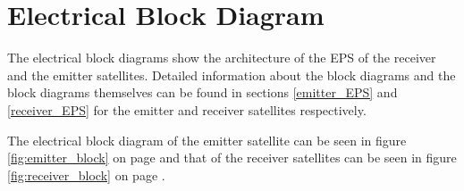 \section{Electrical Block Diagram}
\label{EBD}

The electrical block diagrams show the architecture of the \ac{EPS} of the receiver and the emitter satellites. Detailed information about the block diagrams and the block diagrams themselves can be found in sections \ref{emitter_EPS} and \ref{receiver_EPS} for the emitter and receiver satellites respectively.

The electrical block diagram of the emitter satellite can be seen in figure \ref{fig:emitter_block} on page \pageref{fig:emitter_block} and that of the receiver satellites can be seen in figure \ref{fig:receiver_block} on page \pageref{fig:receiver_block}.